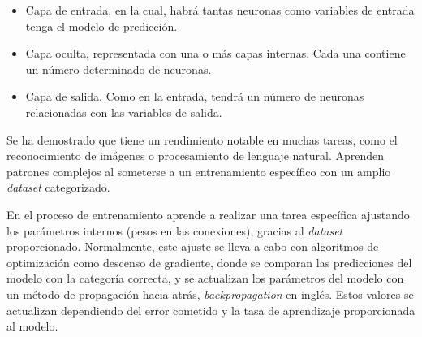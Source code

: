 		\begin{itemize}
			\item Capa de entrada, en la cual, habrá tantas neuronas como variables de entrada tenga el modelo de predicción.
			\vspace{-0.4cm} 
			\item Capa oculta, representada con una o más capas internas. Cada una contiene un número determinado de neuronas.
			\vspace{-0.4cm}	
			\item Capa de salida. Como en la entrada, tendrá un número de neuronas relacionadas con las variables de salida.
		\end{itemize}
		
		\vspace{-0.2cm}
		
		Se ha demostrado que tiene un rendimiento notable en muchas tareas, como el reconocimiento de imágenes o procesamiento de lenguaje natural. Aprenden patrones complejos al someterse a un entrenamiento específico con un amplio \textit{dataset} categorizado.	
		
		
		En el proceso de entrenamiento aprende a realizar una tarea específica ajustando los parámetros internos (pesos en las conexiones), gracias al \textit{dataset} proporcionado. Normalmente, este ajuste se lleva a cabo con algoritmos de optimización como descenso de gradiente, donde se comparan las predicciones del modelo con la categoría correcta, y se actualizan los parámetros del modelo con un método de propagación hacia atrás, \textit{backpropagation} en inglés. Estos valores se actualizan dependiendo del error cometido y la tasa de aprendizaje proporcionada al modelo.



